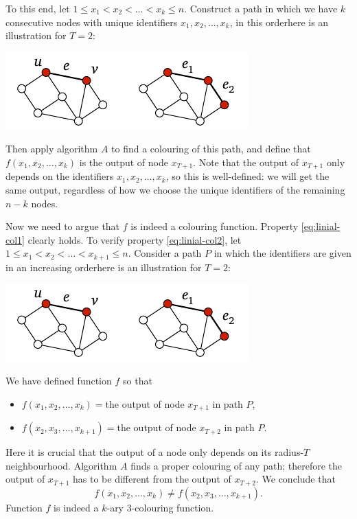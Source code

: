 To this end, let $1 \le x_1 < x_2 < \dotso < x_k \le n$. Construct a path in which we have $k$ consecutive nodes with unique identifiers $x_1, x_2, \dotsc, x_k$, in this order\mydash here is an illustration for $T = 2$:
\begin{center}
    \includegraphics[page=\PIntroIdIncr]{figs.pdf}
\end{center}
Then apply algorithm $A$ to find a colouring of this path, and define that $f(x_1, x_2, \dotsc, x_k)$ is the output of node $x_{T+1}$. Note that the output of $x_{T+1}$ only depends on the identifiers $x_1, x_2, \dotsc,\allowbreak x_k$, so this is well-defined: we will get the same output, regardless of how we choose the unique identifiers of the remaining $n-k$ nodes.

Now we need to argue that $f$ is indeed a colouring function. Property \eqref{eq:linial-col1} clearly holds. To verify property \eqref{eq:linial-col2}, let $1 \le x_1 < x_2 < \dotso < x_{k+1} \le n$. Consider a path $P$ in which the identifiers are given in an increasing order\mydash here is an illustration for $T = 2$:
\begin{center}
    \includegraphics[page=\PIntroIdIncrB]{figs.pdf}
\end{center}
We have defined function $f$ so that
\begin{itemize}
    \item $f(x_1, x_2, \dotsc, x_k) = {}$the output of node $x_{T+1}$ in path $P$,
    \item $f(x_2, x_3, \dotsc, x_{k+1}) = {}$the output of node $x_{T+2}$ in path $P$.
\end{itemize}
Here it is crucial that the output of a node only depends on its radius-$T$ neighbourhood. Algorithm $A$ finds a proper colouring of any path; therefore the output of $x_{T+1}$ has to be different from the output of $x_{T+2}$. We conclude that
\[
    f(x_1, x_2, \dotsc, x_k) \ne f(x_2, x_3, \dotsc, x_{k+1}).
\]
Function $f$ is indeed a $k$-ary $3$-colouring function.


